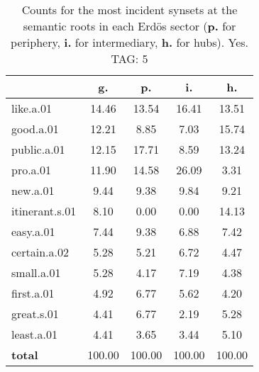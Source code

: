 \begin{table}[h!]
\begin{center}
\begin{tabular}{| l | c | c | c | c |}\hline
 & g. & p. & i. & h. \\\hline
like.a.01 & 14.46  & 13.54  & 16.41  & 13.51 \\\hline
good.a.01 & 12.21  & 8.85  & 7.03  & 15.74 \\\hline
public.a.01 & 12.15  & 17.71  & 8.59  & 13.24 \\\hline
pro.a.01 & 11.90  & 14.58  & 26.09  & 3.31 \\\hline
new.a.01 & 9.44  & 9.38  & 9.84  & 9.21 \\\hline
itinerant.s.01 & 8.10  & 0.00  & 0.00  & 14.13 \\\hline
easy.a.01 & 7.44  & 9.38  & 6.88  & 7.42 \\\hline
certain.a.02 & 5.28  & 5.21  & 6.72  & 4.47 \\\hline
small.a.01 & 5.28  & 4.17  & 7.19  & 4.38 \\\hline
first.a.01 & 4.92  & 6.77  & 5.62  & 4.20 \\\hline
great.s.01 & 4.41  & 6.77  & 2.19  & 5.28 \\\hline
least.a.01 & 4.41  & 3.65  & 3.44  & 5.10 \\\hline
{{\bf total}} & 100.00  & 100.00  & 100.00  & 100.00 \\\hline
\end{tabular}
\caption{Counts for the most incident synsets at the semantic roots in each Erd\"os sector ({\bf p.} for periphery, {\bf i.} for intermediary, {\bf h.} for hubs). Yes. TAG: 5}
\end{center}
\end{table}